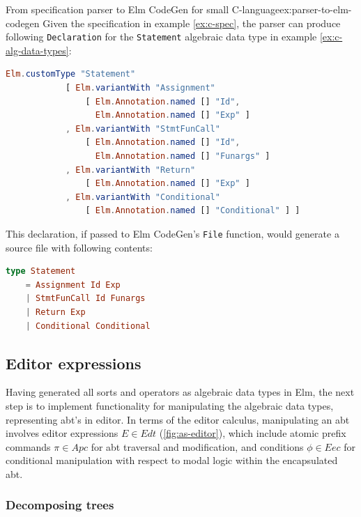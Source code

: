 \begin{example}{From specification parser to Elm CodeGen for small C-language}{ex:parser-to-elm-codegen}
  Given the specification in example \cref{ex:c-spec}, the parser can produce following \texttt{Declaration} for the \texttt{Statement} algebraic data type in example \cref{ex:c-alg-data-types}:
  \begin{lstlisting}[backgroundcolor=\color{myexamplecolorback},language=elm]
Elm.customType "Statement"
            [ Elm.variantWith "Assignment" 
                [ Elm.Annotation.named [] "Id", 
                  Elm.Annotation.named [] "Exp" ]
            , Elm.variantWith "StmtFunCall" 
                [ Elm.Annotation.named [] "Id", 
                  Elm.Annotation.named [] "Funargs" ]
            , Elm.variantWith "Return" 
                [ Elm.Annotation.named [] "Exp" ]
            , Elm.variantWith "Conditional" 
                [ Elm.Annotation.named [] "Conditional" ] ]
\end{lstlisting}

  This declaration, if passed to Elm CodeGen's \texttt{File} function, would generate a source file with following contents:
  \begin{lstlisting}[backgroundcolor=\color{myexamplecolorback},language=elm]
type Statement
    = Assignment Id Exp
    | StmtFunCall Id Funargs
    | Return Exp
    | Conditional Conditional
\end{lstlisting}
\end{example}

\subsection{Editor expressions}

Having generated all sorts and operators as algebraic data types in Elm,
the next step is to implement functionality for manipulating the algebraic
data types, representing abt's in editor.
In terms of the editor calculus\cite{aalborg},
manipulating an abt involves editor expressions $E \in Edt$ (\cref{fig:as-editor}),
which include atomic prefix commands $\pi \in Apc$ for abt traversal
and modification, and conditions $\phi \in Eec$ for conditional manipulation with
respect to modal logic within the encapsulated abt.

\subsubsection{Decomposing trees}

